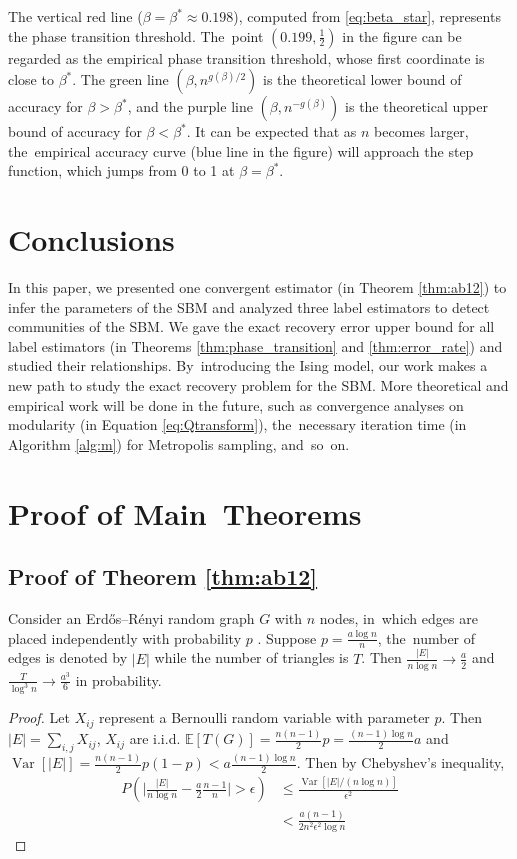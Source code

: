 \documentclass[entropy,article,accept,moreauthors,pdftex]{Definitions/mdpi}
\newcommand{\A}{\frac{a \log n}{n}}
\newcommand{\1}{\mathbbm{1}}
\DeclareMathOperator{\Var}{Var}
\begin{document}
\begin{paracol}{2}
\switchcolumn


The vertical red line ($\beta=\beta^* \approx  0.198$), computed from \eqref{eq:beta_star}, represents the phase transition threshold. The~point $(0.199,\frac{1}{2})$ in the figure
can be regarded as the empirical phase transition threshold, whose first coordinate is close to $\beta^*$.
The green line $(\beta, n^{g(\beta)/2})$ is the theoretical lower bound of accuracy for $\beta>\beta^*$, and the purple line
$(\beta, n^{-g(\beta)})$ is the theoretical upper bound of accuracy for $\beta < \beta^*$. It can be expected that
as $n$ becomes larger, the~empirical accuracy curve (blue line in the figure) will approach the step function, which jumps from
0 to 1 at $\beta=\beta^*$.
\section{Conclusions}
In this paper, we presented  one convergent estimator (in Theorem \ref{thm:ab12}) to infer the parameters of the SBM and analyzed three label estimators to detect communities of the SBM.
We gave the exact recovery error upper bound for all label estimators (in Theorems \ref{thm:phase_transition} and \ref{thm:error_rate})
and studied their relationships. By~introducing the Ising model, our work makes a new path to study the exact recovery problem for the SBM. More
theoretical and empirical work will be done in the future, such as convergence analyses on modularity (in Equation \eqref{eq:Qtransform}), the~necessary iteration time (in Algorithm \ref{alg:m}) for Metropolis sampling, and~so~on.

\section{Proof of Main~Theorems}\label{sec:pm}
\subsection{Proof of Theorem \ref{thm:ab12}}
\begin{Lemma}\label{lem:ER_tr_counting}
	Consider an Erdős–Rényi random graph $G$ with $n$ nodes, in~which edges are placed independently with probability $p$ \cite{erdHos1960evolution}. Suppose
	$p=\A$, the~number of edges is denoted by $|E|$ while the number of triangles is $T$. Then
	$\frac{|E|}{n \log n} \to \frac{a}{2}$ and $\frac{T}{\log^3 n} \to \frac{a^3}{6}$ in probability.
\end{Lemma}
\begin{proof}
		Let $X_{ij}$ represent a Bernoulli random variable with parameter $p$. Then $|E| = \sum_{i,j} X_{ij}$, $X_{ij}$ are i.i.d.
	$\mathbb{E}[T(G)] = \frac{n(n-1)}{2}p = \frac{(n-1)\log n}{2}a$ and $\Var[|E|] = \frac{n(n-1)}{2} p(1-p) < a\frac{(n-1)\log n}{2}$.
	Then by Chebyshev's inequality,
	\begin{align*}
	P(\Big|\frac{|E|}{n \log n } - \frac{a}{2} \frac{n-1}{n}\Big| > \epsilon) & \leq
	\frac{\Var[|E| /(n \log n )]}{\epsilon^2} \\
	& < \frac{a(n-1)}{2n^2\epsilon^2\log n}
	\end{align*}
	

\end{proof}
\end{paracol}
\end{document}
